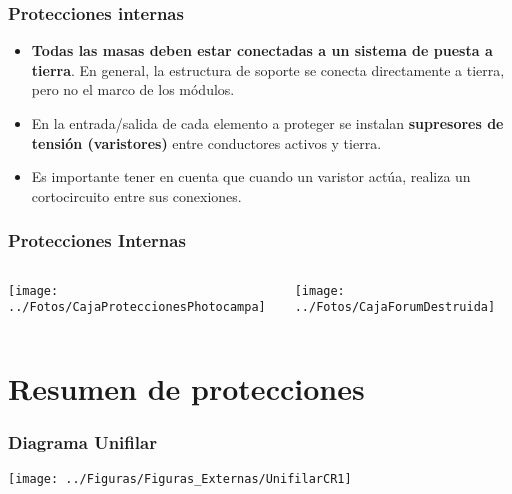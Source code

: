 \documentclass[serif, xcolor=dvipsnames]{beamer}
\begin{document}
\begin{frame}
\frametitle{Protecciones internas}
\begin{itemize}
\item \textbf{Todas las masas deben estar conectadas a un sistema de puesta
a tierra}. En general, la estructura de soporte se conecta directamente
a tierra, pero no el marco de los módulos.
\item En la entrada/salida de cada elemento a proteger se instalan \textbf{supresores
de tensión (varistores)} entre conductores activos y tierra.
\item Es importante tener en cuenta que cuando un varistor actúa, realiza
un cortocircuito entre sus conexiones.
\end{itemize}

\end{frame}

\begin{frame}[plain]
\frametitle{Protecciones Internas}
\begin{columns}[c]%


\column{5cm}

\begin{center}
\texttt{[image: ../Fotos/CajaProteccionesPhotocampa]}
\par\end{center}


\column{5cm}

\begin{center}
\texttt{[image: ../Fotos/CajaForumDestruida]}
\par\end{center}

\end{columns}%

\end{frame}

\section{Resumen de protecciones}


\begin{frame}
\frametitle{Diagrama Unifilar}

\begin{center}
\texttt{[image: ../Figuras/Figuras\_Externas/UnifilarCR1]}
\par\end{center}


\end{frame}
\end{document}
